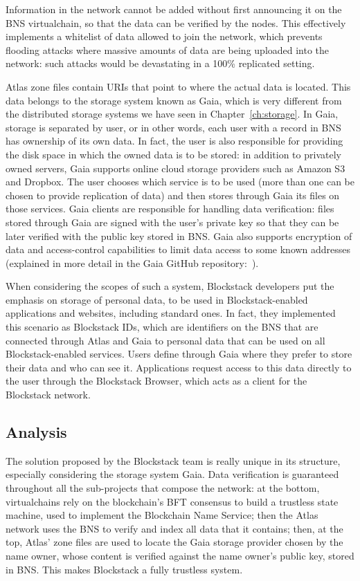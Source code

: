 \documentclass[mscthesis]{usiinfthesis}
\begin{document}
Information in the network cannot be added without first announcing it on the BNS virtualchain, so that the data can be verified by the nodes. This effectively implements a whitelist of data allowed to join the network, which prevents flooding attacks where massive amounts of data are being uploaded into the network: such attacks would be devastating in a 100\% replicated setting.

Atlas zone files contain URIs that point to where the actual data is located. This data belongs to the storage system known as Gaia, which is very different from the distributed storage systems we have seen in Chapter~\ref{ch:storage}. In Gaia, storage is separated by user, or in other words, each user with a record in BNS has ownership of its own data. In fact, the user is also responsible for providing the disk space in which the owned data is to be stored: in addition to privately owned servers, Gaia supports online cloud storage providers such as Amazon S3 and Dropbox. The user chooses which service is to be used (more than one can be chosen to provide replication of data) and then stores through Gaia its files on those services. Gaia clients are responsible for handling data verification: files stored through Gaia are signed with the user's private key so that they can be later verified with the public key stored in BNS. Gaia also supports encryption of data and access-control capabilities to limit data access to some known addresses (explained in more detail in the Gaia GitHub repository:~\cite{website:gaiaaccesscontrol}).

When considering the scopes of such a system, Blockstack developers put the emphasis on storage of personal data, to be used in Blockstack-enabled applications and websites, including standard ones. In fact, they implemented this scenario as Blockstack IDs, which are identifiers on the BNS that are connected through Atlas and Gaia to personal data that can be used on all Blockstack-enabled services. Users define through Gaia where they prefer to store their data and who can see it. Applications request access to this data directly to the user through the Blockstack Browser, which acts as a client for the Blockstack network.

\subsection{Analysis}

The solution proposed by the Blockstack team is really unique in its structure, especially considering the storage system Gaia. Data verification is guaranteed throughout all the sub-projects that compose the network: at the bottom, virtualchains rely on the blockchain's BFT consensus to build a trustless state machine, used to implement the Blockchain Name Service; then the Atlas network uses the BNS to verify and index all data that it contains; then, at the top, Atlas' zone files are used to locate the Gaia storage provider chosen by the name owner, whose content is verified against the name owner's public key, stored in BNS. This makes Blockstack a fully trustless system.
\end{document}

